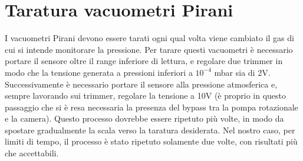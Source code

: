 \documentclass[11pt]{article}
\begin{document}
\section{Taratura vacuometri Pirani}
I vacuometri Pirani devono essere tarati ogni qual volta viene cambiato il gas di cui si intende monitorare la pressione. Per tarare questi vacuometri è necessario portare il sensore oltre il range inferiore di lettura, e regolare due trimmer in modo che la tensione generata a pressioni inferiori a $10^{-4}$ mbar sia di 2V. Successivamente è necessario portare il sensore alla pressione atmosferica e, sempre lavorando sui trimmer, regolare la tensione a 10V (è proprio in questo passaggio che si è resa necessaria la presenza del bypass tra la pompa rotazionale e la camera). Questo processo dovrebbe essere ripetuto più volte, in modo da spostare gradualmente la scala verso la taratura desiderata. Nel nostro caso, per limiti di tempo, il processo è stato ripetuto solamente due volte, con risultati più che accettabili.  
\end{document}
